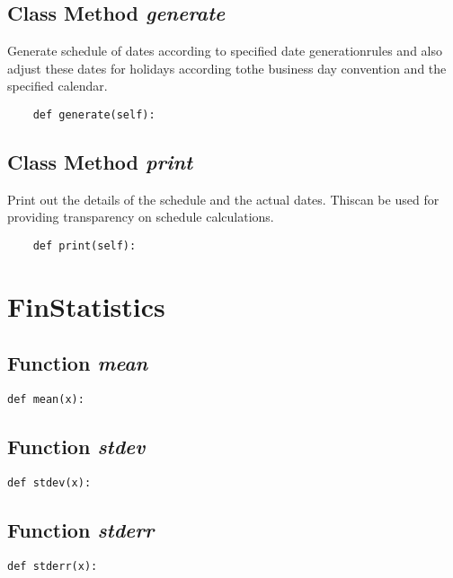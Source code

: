 \documentclass[twoside,11pt]{book}
\begin{document}
\subsection{Class Method {\it generate}}
Generate schedule of dates according to specified date generationrules and also adjust these dates for holidays according tothe business day convention and the specified calendar. 

\begin{lstlisting}
    def generate(self):
\end{lstlisting}

\subsection{Class Method {\it print}}
Print out the details of the schedule and the actual dates. Thiscan be used for providing transparency on schedule calculations. 

\begin{lstlisting}
    def print(self):
\end{lstlisting}

\newpage
\section{FinStatistics}

\subsection{Function {\it mean}}


\begin{lstlisting}
def mean(x):
\end{lstlisting}

\subsection{Function {\it stdev}}


\begin{lstlisting}
def stdev(x):
\end{lstlisting}

\subsection{Function {\it stderr}}


\begin{lstlisting}
def stderr(x):
\end{lstlisting}
\end{document}

